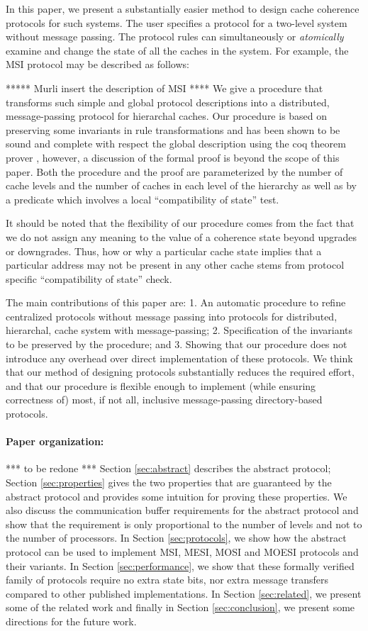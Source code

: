 In this paper, we present a substantially easier method to design cache
coherence protocols for such systems. The user specifies a protocol for a
two-level system without message passing. The protocol rules can simultaneously
or \emph{atomically} examine and change the state of all the caches in the
system. For example, the MSI protocol may be described as follows: 

***** Murli insert the description of MSI **** We give a procedure that
transforms such simple and global protocol descriptions into a distributed,
message-passing protocol for hierarchal caches. Our procedure is based on
preserving some invariants in rule transformations and has been shown to be
sound and complete with respect the global description using the coq theorem
prover \cite{}, however, a discussion of the formal proof is beyond the scope
of this paper. Both the procedure and the proof are parameterized by the number
of cache levels and the number of caches in each level of the hierarchy as well
as by a predicate which involves a local ``compatibility of state'' test. 

It should be noted that the flexibility of our procedure comes from the fact
that we do not assign any meaning to the value of a coherence state beyond
upgrades or downgrades. Thus, how or why a particular cache state implies that
a particular address may not be present in any other cache stems from protocol
specific ``compatibility of state'' check. 

The main contributions of this paper are: 1. An automatic procedure to refine
centralized protocols without message passing into protocols for distributed,
hierarchal, cache system with message-passing; 2. Specification of the
invariants to be preserved by the procedure; and 3. Showing that our procedure
does not introduce any overhead over direct implementation of these protocols.
We think that our method of designing protocols substantially reduces the
required effort, and that our procedure is flexible enough to implement (while
ensuring correctness of) most, if not all, inclusive message-passing
directory-based protocols.

\paragraph{Paper organization:} *** to be redone *** Section \ref{sec:abstract}
describes the abstract protocol; Section \ref{sec:properties} gives the two
properties that are guaranteed by the abstract protocol and provides some
intuition for proving these properties. We also discuss the communication
buffer requirements for the abstract protocol and show that the requirement is
only proportional to the number of levels and not to the number of processors.
In Section \ref{sec:protocols}, we show how the abstract protocol can be used
to implement MSI, MESI, MOSI and MOESI protocols and their variants.  In
Section \ref{sec:performance}, we show that these formally verified family of
protocols require no extra state bits, nor extra message transfers compared to
other published implementations.  In Section \ref{sec:related}, we present some
of the related work and finally in Section \ref{sec:conclusion}, we present
some directions for the future work.
